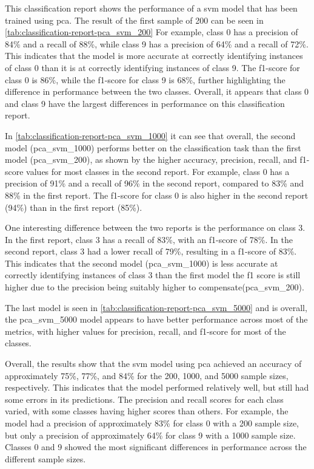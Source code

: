 This classification report shows the performance of a \gls{svm} model that has been trained using \gls{pca}. The result of the first sample of 200 can be seen in \ref{tab:classification-report-pca_svm_200}
For example, class 0 has a precision of 84\% and a recall of 88\%, while class 9 has a precision of 64\% and a recall of 72\%. This indicates that the model is more accurate at correctly identifying instances of class 0 than it is at correctly identifying instances of class 9. The f1-score for class 0 is 86\%, while the f1-score for class 9 is 68\%, further highlighting the difference in performance between the two classes. Overall, it appears that class 0 and class 9 have the largest differences in performance on this classification report.



In \ref{tab:classification-report-pca_svm_1000} it can see that overall, the second model (pca\_svm\_1000) performs better on the classification task than the first model (pca\_svm\_200), as shown by the higher accuracy, precision, recall, and f1-score values for most classes in the second report. For example, class 0 has a precision of 91\% and a recall of 96\% in the second report, compared to 83\% and 88\% in the first report. The f1-score for class 0 is also higher in the second report (94\%) than in the first report (85\%).

One interesting difference between the two reports is the performance on class 3. In the first report, class 3 has a recall of 83\%, with an f1-score of 78\%. In the second report, class 3 had a lower recall of 79\%, resulting in a f1-score of 83\%. This indicates that the second model (pca\_svm\_1000) is less accurate at correctly identifying instances of class 3 than the first model the f1 score is still higher due to the precision being suitably higher to compensate(pca\_svm\_200).

The last model is seen in \ref{tab:classification-report-pca_svm_5000} and is overall, the pca\_svm\_5000 model appears to have better performance across most of the metrics, with higher values for precision, recall, and f1-score for most of the classes.




Overall, the results show that the \gls{svm} model using \gls{pca} achieved an accuracy of approximately 75\%, 77\%, and 84\% for the 200, 1000, and 5000 sample sizes, respectively. This indicates that the model performed relatively well, but still had some errors in its predictions. The precision and recall scores for each class varied, with some classes having higher scores than others. For example, the model had a precision of approximately 83\% for class 0 with a 200 sample size, but only a precision of approximately 64\% for class 9 with a 1000 sample size. Classes 0 and 9 showed the most significant differences in performance across the different sample sizes.

